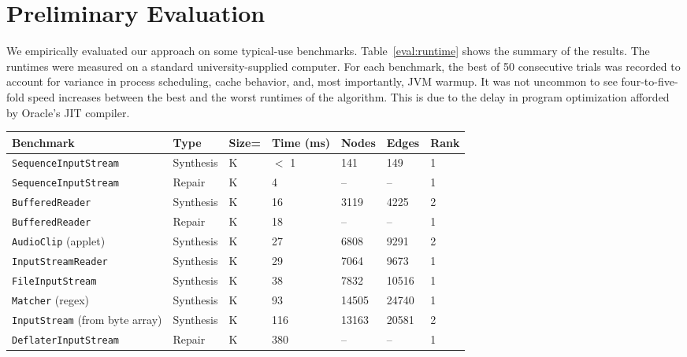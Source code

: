 \section{Preliminary Evaluation}
\label{sec:evaluation}

We empirically evaluated our approach on some typical-use benchmarks. Table~\ref{eval:runtime} shows the summary of the results. The runtimes were measured on a standard university-supplied computer. For each benchmark, the best of 50 consecutive trials was recorded to account for variance in process scheduling, cache behavior, and, most importantly, JVM warmup. It was not uncommon to see four-to-five-fold speed increases between the best and the worst runtimes of the algorithm. This is due to the delay in program optimization afforded by Oracle's JIT compiler.

\begin{table*}[hbt]
  \centering
  \begin{tabularx}{\linewidth}{| X | l  | l | l | l | l | l |}
    \hline
    \textbf{Benchmark} & \textbf{Type} & \textbf{Size=} & \textbf{Time (ms)} & \textbf{Nodes} & \textbf{Edges} & \textbf{Rank} \\ \hline
	\texttt{SequenceInputStream} & Synthesis & K & $<$ 1 & 141   & 149   & 1 \\ \hline
	\texttt{SequenceInputStream} & Repair    & K & 4   & --    & --    & 1 \\ \hline
    \texttt{BufferedReader}      & Synthesis & K & 16  & 3119  & 4225  & 2 \\ \hline
    \texttt{BufferedReader}      & Repair    & K & 18  & --    & --    & 1 \\ \hline
    \texttt{AudioClip} (applet)  & Synthesis & K & 27  & 6808  & 9291  & 2 \\ \hline
    \texttt{InputStreamReader}   & Synthesis & K & 29  & 7064  & 9673  & 1 \\ \hline
    \texttt{FileInputStream}     & Synthesis & K & 38  & 7832  & 10516 & 1 \\ \hline
    \texttt{Matcher} (regex)     & Synthesis & K & 93  & 14505 & 24740 & 1 \\ \hline
    \texttt{InputStream} (from byte array) & Synthesis & K & 116 & 13163  & 20581  & 2 \\ \hline
    \texttt{DeflaterInputStream} & Repair & K    & 380 & -- & -- & 1 \\ \hline
  \end{tabularx}
  \caption{Typical-use runtimes in various benchmarks. ``Nodes'' and ``Edges'' refer to the size of the searched subgraph, and ``Rank'' indicates the correct expression's position among the results. The entire Java standard library was used to build the graph before running the benchmarks. Each test case was initialized with a small environment consisting of five variables.}
  \label{eval:runtime}
\end{table*}

